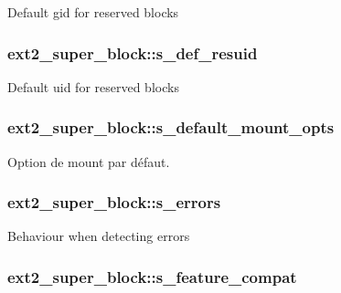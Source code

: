 Default gid for reserved blocks \hypertarget{structext2__super__block_a83da108c4a1f27a275f54970fb8edf07}{
\subsubsection[{s\-\_\-def\-\_\-resuid}]{ ext2\-\_\-super\-\_\-block\-::s\-\_\-def\-\_\-resuid}}\label{structext2__super__block_a83da108c4a1f27a275f54970fb8edf07}
Default uid for reserved blocks \hypertarget{structext2__super__block_a8f4946dffa8c6a9027ee9329fd3f94c9}{
\subsubsection[{s\-\_\-default\-\_\-mount\-\_\-opts}]{ ext2\-\_\-super\-\_\-block\-::s\-\_\-default\-\_\-mount\-\_\-opts}}\label{structext2__super__block_a8f4946dffa8c6a9027ee9329fd3f94c9}
Option de mount par défaut. \hypertarget{structext2__super__block_a06e31d621f6250d56d1af5c342220a08}{
\subsubsection[{s\-\_\-errors}]{ ext2\-\_\-super\-\_\-block\-::s\-\_\-errors}}\label{structext2__super__block_a06e31d621f6250d56d1af5c342220a08}
Behaviour when detecting errors \hypertarget{structext2__super__block_a1cf404a1bcfb748e924c62032cd723a5}{
\subsubsection[{s\-\_\-feature\-\_\-compat}]{ ext2\-\_\-super\-\_\-block\-::s\-\_\-feature\-\_\-compat}}\label{structext2__super__block_a1cf404a1bcfb748e924c62032cd723a5}
